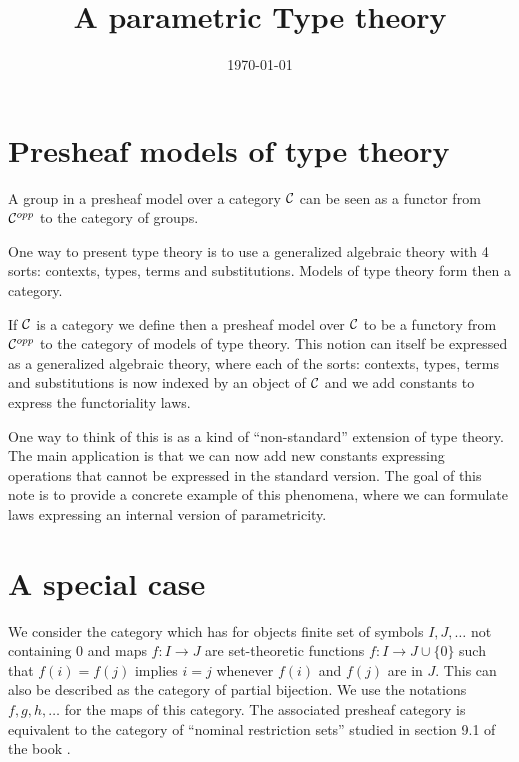 \documentclass[10pt,a4paper]{article}
\begin{document}
\title{A parametric Type theory}

\author{}
\date{\today}
\maketitle

\section*{Presheaf models of type theory}

 A group in a presheaf model over a category ${\cal C}$ can be seen as a functor
from ${\cal C}^{opp}$ to the category of groups.

 One way to present type theory is to use a generalized algebraic theory
with 4 sorts: contexts, types, terms and substitutions. Models of type theory
form then a category.

 If ${\cal C}$ is a category we define then a presheaf model over ${\cal C}$
to be a functory from ${\cal C}^{opp}$ to the category of models of type theory.
This notion can itself be expressed as a generalized algebraic theory, where each
of the sorts: contexts, types, terms and substitutions is now indexed by an object
of ${\cal C}$ and we add constants to express the functoriality laws.

\medskip

 One way to think of this is as a kind of ``non-standard'' extension of type theory.
The main application is that we can now add new constants expressing operations
that cannot be expressed in the standard version. The goal of this note is to provide
a concrete example of this phenomena, where we can formulate laws expressing an 
internal version of parametricity.

\section{A special case}


 We consider the category which has for objects finite set of symbols
$I,J,\dots$ not containing $0$ and maps $f:I\rightarrow J$
are set-theoretic functions $f:I\rightarrow J\cup\{0\}$ such that 
$f(i) = f(j)$ implies $i=j$ whenever $f(i)$ and $f(j)$ are in $J$.
This can also be described as the category of partial bijection.
We use the notations $f,g,h,\dots$ for the maps of this category.
The associated presheaf category is
equivalent to the category of ``nominal restriction sets'' studied in
section 9.1 of the book \cite{pitts}.
\end{document}
